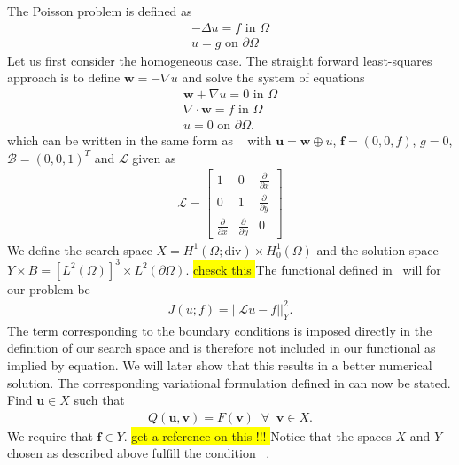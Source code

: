 The Poisson problem is defined as 
\begin{align}
	-\Delta u = f \text{ in } \Omega \\
	u = g \text{ on } \partial \Omega
	\label{eq:Poisson}
\end{align}
Let us first consider the homogeneous case. The straight forward least-squares approach is to define $\mathbf{w} = -\nabla u$ and solve the system of equations 
\begin{align}
	\mathbf{w} + \nabla u = 0 \text{ in } \Omega \\
	\nabla \cdot \mathbf{w} = f \text{ in } \Omega \\
	u = 0 \text{ on } \partial \Omega.
	\label{eq:PoissonSystem}
\end{align}
which can be written in the same form as ~ with $ \mathbf{u} = \mathbf{w} \oplus u $, $\mathbf{f} = (0,0,f)$, $g=0$, $\mathcal{B} = (0,0,1)^T $ and $\mathcal{L}$ given as 
\begin{align}
	\mathcal{L} =
	\begin{bmatrix}
		1 & 0 & \frac{\partial} {\partial x}  \\
		0 & 1 & \frac{\partial} {\partial y}  \\
    \frac{\partial} {\partial x} & \frac{\partial} {\partial y} & 0 
	\end{bmatrix}
	\label{eq:Amatrix}
\end{align}
We define the search space $X =  H^1(\Omega;\text{div}) \times H_0^1(\Omega)$ and the solution space $Y \times B  = [L^2(\Omega)]^3\times L^2(\partial \Omega) $. \colorbox{yellow}{chesck this } The functional defined in~ will for our problem be 
\begin{align}
	J(u;f) = ||\mathcal{L}u-f||^2_Y.
	\label{eq:lsFunctionalPoisson}
\end{align}
The term corresponding to the boundary conditions is imposed directly in the definition of our search space and is therefore not included in our functional as implied by equation. We will later show that this results in a better numerical solution. The corresponding variational formulation defined in can now be stated. Find $ \mathbf{u} \in X $ such that
\begin{align}
	Q(\mathbf{u},\mathbf{v}) = F(\mathbf{v}) \;\; \forall \;\; \mathbf{v} \in X.
	\label{eq:VariationalFormulationPoisson}
\end{align}
We require that $\mathbf{f} \in Y$.
\colorbox{yellow}{get a reference on this !!! }
Notice that the spaces $X$ and $Y$ chosen as described above fulfill the condition ~. 
%

